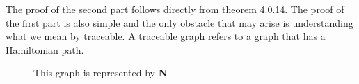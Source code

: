 \documentclass[../basic_graph_theory.tex]{subfiles}
\begin{document}
The proof of the second part follows directly from theorem 4.0.14. The proof of the first part is also simple and the only obstacle that may arise is understanding what we mean by traceable. A traceable graph refers to a graph that has a Hamiltonian path.
\begin{figure}[htbp]
    \begin{center}
    \end{center}
    \caption{This graph is represented by \textbf{N}}
\end{figure}
\end{document}
